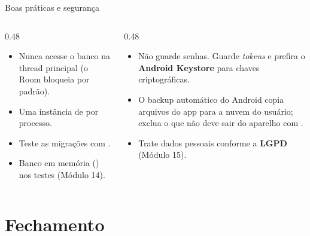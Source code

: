 \documentclass[aspectratio=169,10pt]{beamer}
\begin{document}
\begin{frame}{Boas práticas e segurança}
  \begin{columns}[T]
    \begin{column}{0.48\textwidth}
      \begin{conceito}
        \begin{itemize}
          \item Nunca acesse o banco na thread principal (o Room bloqueia por padrão).
          \item Uma instância de  por processo.
          \item Teste as migrações com .
          \item Banco em memória () nos testes (Módulo 14).
        \end{itemize}
      \end{conceito}
    \end{column}
    \begin{column}{0.48\textwidth}
      \begin{atencao}
        \begin{itemize}
          \item Não guarde senhas. Guarde \emph{tokens} e prefira o \textbf{Android Keystore} para chaves criptográficas.
          \item O backup automático do Android copia arquivos do app para a nuvem do usuário; exclua o que não deve sair do aparelho com .
          \item Trate dados pessoais conforme a \textbf{LGPD} (Módulo 15).
        \end{itemize}
      \end{atencao}
    \end{column}
  \end{columns}
\end{frame}

\section{Fechamento}
\end{document}
